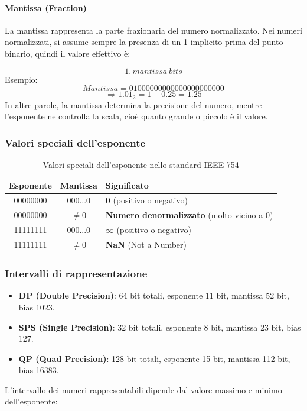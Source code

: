 \documentclass[12pt]{article}
\begin{document}
\paragraph{Mantissa (Fraction)}
La mantissa rappresenta la parte frazionaria del numero normalizzato.  
Nei numeri normalizzati, si assume sempre la presenza di un 1 implicito prima del punto binario, quindi il valore effettivo è:

\[
1.\,mantissa\ bits
\]
Esempio:
\[
Mantissa = 01000000000000000000000
\]
\[
\Rightarrow 1.01_2 = 1 + 0.25 = 1.25
\]
In altre parole, la mantissa determina la precisione del numero, mentre l'esponente ne controlla la scala, cioè quanto grande o piccolo è il valore.

\subsubsection{Valori speciali dell'esponente}
\begin{table}[h!]
\centering
\resizebox{\textwidth}{!} {
\begin{tabular}{|c|c|l|}
\hline
\textbf{Esponente} & \textbf{Mantissa} & \textbf{Significato} \\ \hline
00000000 & 000...0 & \textbf{0} (positivo o negativo) \\ \hline
00000000 & $\neq$0 & \textbf{Numero denormalizzato} (molto vicino a 0) \\ \hline
11111111 & 000...0 & \textbf{$\infty$} (positivo o negativo) \\ \hline
11111111 & $\neq$0 & \textbf{NaN} (Not a Number) \\ \hline
\end{tabular}
}
\caption{Valori speciali dell'esponente nello standard IEEE 754}
\end{table}
\subsubsection{Intervalli di rappresentazione}
\begin{itemize}
    \item \textbf{DP (Double Precision)}: 64 bit totali, esponente 11 bit, mantissa 52 bit, bias 1023.
    \item \textbf{SPS (Single Precision)}: 32 bit totali, esponente 8 bit, mantissa 23 bit, bias 127.
    \item \textbf{QP (Quad Precision)}: 128 bit totali, esponente 15 bit, mantissa 112 bit, bias 16383.
\end{itemize}
L'intervallo dei numeri rappresentabili dipende dal valore massimo e minimo dell'esponente:
\end{document}
